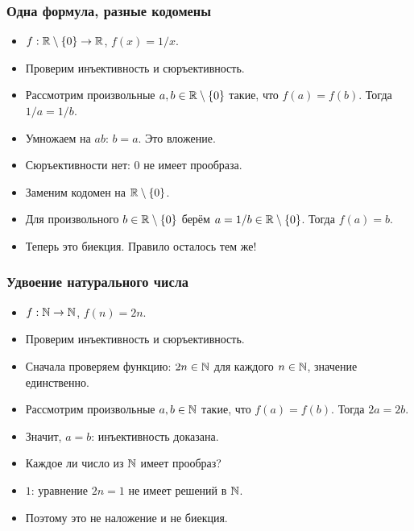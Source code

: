 \documentclass[10pt]{beamer}
\begin{document}
\begin{frame}
    \frametitle{Одна формула, разные кодомены}
    \begin{itemize}
        \item $f:\mathbb{R}\setminus\{0\}\to\mathbb{R}$, $f(x)=1/x$.
        \item Проверим инъективность и сюръективность.
        \item<2-> Рассмотрим произвольные $a,b\in\mathbb{R}\setminus\{0\}$ такие, что $f(a)=f(b)$. Тогда $1/a=1/b$.
        \item<3-> Умножаем на $ab$: $b=a$. Это вложение.
        \item<4-> Сюръективности нет: $0$ не имеет прообраза.
        \item<5-> Заменим кодомен на $\mathbb{R}\setminus\{0\}$.
        \item<6-> Для произвольного $b\in\mathbb{R}\setminus\{0\}$ берём $a=1/b\in\mathbb{R}\setminus\{0\}$. Тогда $f(a)=b$.
        \item<7-> Теперь это биекция. Правило осталось тем же!
    \end{itemize}
\end{frame}

\begin{frame}
    \frametitle{Удвоение натурального числа}
    \begin{itemize}
        \item $f:\mathbb{N}\to\mathbb{N}$, $f(n)=2n$.
        \item Проверим инъективность и сюръективность.
        \item<2-> Сначала проверяем функцию: $2n\in\mathbb{N}$ для каждого $n\in\mathbb{N}$, значение единственно.
        \item<3-> Рассмотрим произвольные $a,b\in\mathbb{N}$ такие, что $f(a)=f(b)$. Тогда $2a=2b$.
        \item<4-> Значит, $a=b$: инъективность доказана.
        \item<5-> Каждое ли число из $\mathbb{N}$ имеет прообраз?
        \item<6-> $1$: уравнение $2n=1$ не имеет решений в $\mathbb{N}$.
        \item<7-> Поэтому это не наложение и не биекция.
    \end{itemize}
\end{frame}
\end{document}
